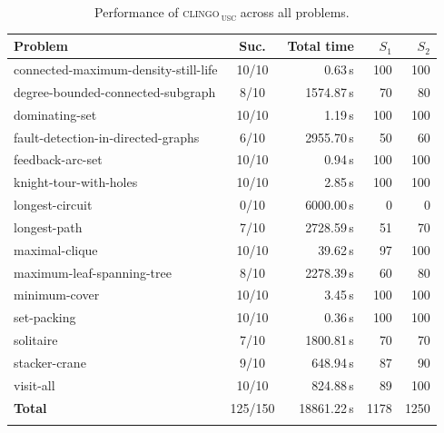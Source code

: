 \begin{table}[htbp]
\centering
\caption{Performance of \textsc{clingo\,\textsubscript{usc}} across all problems.}
\label{tab:performance-clingo_usc}
\begin{tabular}{lcrrr}
\toprule
Problem & Suc. & Total time & $S_1$ & $S_2$ \\
\midrule
connected-maximum-density-still-life & 10/10 & 0.63\,s & 100 & 100 \\
degree-bounded-connected-subgraph & 8/10 & 1574.87\,s & 70 & 80 \\
dominating-set & 10/10 & 1.19\,s & 100 & 100 \\
fault-detection-in-directed-graphs & 6/10 & 2955.70\,s & 50 & 60 \\
feedback-arc-set & 10/10 & 0.94\,s & 100 & 100 \\
knight-tour-with-holes & 10/10 & 2.85\,s & 100 & 100 \\
longest-circuit & 0/10 & 6000.00\,s & 0 & 0 \\
longest-path & 7/10 & 2728.59\,s & 51 & 70 \\
maximal-clique & 10/10 & 39.62\,s & 97 & 100 \\
maximum-leaf-spanning-tree & 8/10 & 2278.39\,s & 60 & 80 \\
minimum-cover & 10/10 & 3.45\,s & 100 & 100 \\
set-packing & 10/10 & 0.36\,s & 100 & 100 \\
solitaire & 7/10 & 1800.81\,s & 70 & 70 \\
stacker-crane & 9/10 & 648.94\,s & 87 & 90 \\
visit-all & 10/10 & 824.88\,s & 89 & 100 \\
\midrule
\textbf{Total} & 125/150 & 18861.22\,s & 1178 & 1250 \\
\botrule
\end{tabular}
\end{table}

